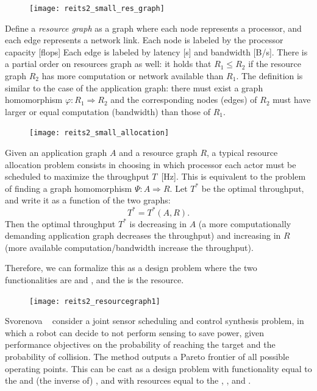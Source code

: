 \begin{figure}
\texttt{[image: reits2\_small\_res\_graph]}\end{figure}

Define a\emph{ resource graph} as a graph where each node represents
a processor, and each edge represents a network link. Each node is
labeled by the processor capacity [flops] Each edge is labeled
by latency [s] and bandwidth [B/s]. There is a partial order
on resources graph as well: it holds that $R_1 \leq R_2$ if
the resource graph $R_2$ has more computation or network available
than $R_1$. The definition is similar to the case of the application
graph: there must exist a graph homomorphism $\varphi:R_1  \Rightarrow R_2$
and the corresponding nodes (edges) of $R_2$ must have larger
or equal computation (bandwidth) than those of $R_1$.

\begin{figure}
\texttt{[image: reits2\_small\_allocation]}\end{figure}

Given an application graph $A$ and a resource graph $R$, a typical
resource allocation problem consists in choosing in which processor
each actor must be scheduled to maximize the throughput $T$~[Hz].
This is equivalent to the problem of finding a graph homomorphism $\Psi:A \Rightarrow R$.
Let $T^{\ast}$ be the optimal throughput, and write it as a function
of the two graphs:
\[
T^{\ast}=T^{\ast}(A,R).
\]
Then the optimal throughput $T^{*}$ is decreasing in $A$ (a more
computationally demanding application graph decreases the throughput)
and increasing in $R$ (more available computation/bandwidth increase
the throughput).

Therefore, we can formalize this as a design problem where the two
functionalities are  and , and the  is the
resource.

\begin{figure}

\texttt{[image: reits2\_resourcegraph1]}

\caption{}
\end{figure}



\begin{example}
Svorenova\,\,\etal~\cite{svorenova16resource} consider a joint
sensor scheduling and control synthesis problem, in which a robot
can decide to not perform sensing to save power, given performance
objectives on the probability of reaching the target and the probability
of collision. The method outputs a Pareto frontier of all possible
operating points. This can be cast as a design problem with functionality
equal to the  and (the inverse
of) , and with resources equal to the
, , and .
    
\end{example}


